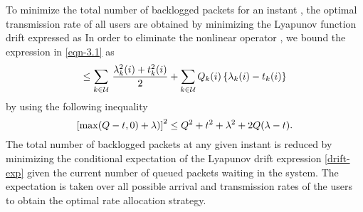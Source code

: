 To minimize the total number of backlogged packets for an instant , the optimal transmission rate of all users are obtained by minimizing the Lyapunov function drift expressed as  
\iftoggle{single_column}{
\begin{equation}\label{eqn-3.1}
\mathrm{L}\sset{\mbf{Q}(i+1)} - \mathrm{L}\sset{\mbf{Q}(i)} = \frac{1}{2} \Big [ \sum_{k \in \mc{U}} \, \Big ( \left [ Q_k(i) - t_k(i) \right ]^+ + \lambda_k(i) \Big )^2 - Q^2_k(i) \Big ].
\end{equation}}{
\begin{multline}\label{eqn-3.1}
\mathrm{L}\sset{\mbf{Q}(i+1)} - \mathrm{L}\sset{\mbf{Q}(i)} = \\ \frac{1}{2} \Big [ \sum_{k \in \mc{U}} \, \Big ( \left [ Q_k(i) - t_k(i) \right ]^+ + \lambda_k(i) \Big )^2 - Q^2_k(i) \Big ].
\end{multline}}
In order to eliminate the nonlinear operator \me{[x]^+}, we bound the expression in \eqref{eqn-3.1} as
\begin{equation}
\leq \sum_{k \in \mc{U}} \, \frac{\lambda^2_k(i) + t_k^2(i)}{2} + \sum_{k \in \mc{U}} Q_k(i) \set{ \lambda_k(i) - t_k(i) }
\label{drift-exp}
\end{equation}
by using the following inequality 
\begin{equation}
\left [ \max(Q-t,0) + \lambda) \right ]^2 \leq Q^2 + t^2 + \lambda^2 + 2 Q (\lambda - t).
\end{equation}
The total number of backlogged packets at any given instant  is reduced by minimizing the conditional expectation of the Lyapunov drift expression \eqref{drift-exp} given the current number of queued packets  waiting in the system. The expectation is taken over all possible arrival and transmission rates of the users to obtain the optimal rate allocation strategy. 

